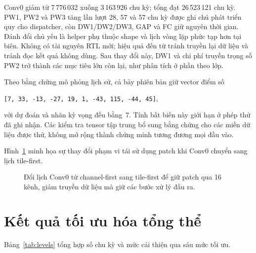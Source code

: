 Conv0 giảm từ 7\,776\,032 xuống 3\,163\,926 chu kỳ; tổng đạt 26\,523\,121 chu kỳ. PW1, PW2 và PW3 tăng lần lượt 28, 57 và 57 chu kỳ được ghi chú phát triển quy cho dispatcher, còn DW1/DW2/DW3, GAP và FC giữ nguyên thời gian. Đánh đổi chủ yếu là helper phụ thuộc shape và lịch vòng lặp phức tạp hơn tại biên. Không có tài nguyên RTL mới; hiệu quả đến từ tránh truyền lại dữ liệu và tránh đọc kết quả không dùng. Sau thay đổi này, DW1 và chi phí truyền trọng số PW2 trở thành các mục tiêu lớn còn lại, như phân tích ở phần theo lớp.

Theo bằng chứng mô phỏng lịch sử, cả bảy phiên bản giữ vector điểm số
\begin{center}
\texttt{[7, 33, -13, -27, 19, 1, -43, 115, -44, 45]},
\end{center}
với dự đoán và nhãn kỳ vọng đều bằng~7. Tính bất biến này giới hạn ở phép thử đã ghi nhận. Các kiểm tra tensor tập trung bổ sung bằng chứng cho các miền dữ liệu được thử, không mở rộng thành chứng minh tương đương mọi đầu vào.

Hình~\ref{fig:tile-reuse-placeholder} minh họa sự thay đổi phạm vi tái sử dụng patch khi Conv0 chuyển sang lịch tile-first.

\begin{figure}[!ht]
\captionsetup{aboveskip=6pt,belowskip=0pt}
\centering
\resizebox{0.93\textwidth}{!}{}
\caption{Đổi lịch Conv0 từ channel-first sang tile-first để giữ patch qua 16 kênh, giảm truyền dữ liệu mà giữ các bước xử lý đầu ra.}
\label{fig:tile-reuse-placeholder}
\end{figure}

\section{Kết quả tối ưu hóa tổng thể}
Bảng~\ref{tab:levels} tổng hợp số chu kỳ và mức cải thiện qua sáu mức tối ưu.

